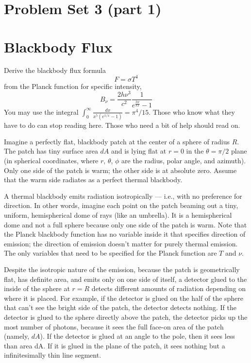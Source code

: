 \documentclass[11pt]{article}
\begin{document}
\pagestyle{empty}
\parindent=0pt

\section*{\centering Problem Set 3 (part 1)}

\section{Blackbody Flux}

Derive the blackbody flux formula
\begin{equation}
F=\sigma T^4
\end{equation}
from the Planck function for specific intensity,
\begin{equation}
B_\nu=\frac{2h\nu^3}{c^2}\frac{1}{e^\frac{h\nu}{kT} - 1}
\end{equation}
You may use the integral $\int_0^\infty{\frac{dx}{x^5(e^{1/x}-1)}}=\pi^4/15$.
Those who know what they have to do can stop reading here. Those who need a bit of help should read on.

Imagine a perfectly flat, blackbody patch at the center of a sphere of radius
$R$. The patch has tiny surface area $dA$ and is lying flat at $r = 0$ in the $\theta=\pi/2$
plane (in spherical coordinates, where $r$, $\theta$, $\phi$ are the radius, polar angle, and
azimuth). Only one side of the patch is warm; the other side is at absolute
zero. Assume that the warm side radiates as a perfect thermal blackbody.

A thermal blackbody emits radiation isotropically --- i.e., with no preference for
direction. In other words, imagine each point on the patch beaming out a tiny,
uniform, hemispherical dome of rays (like an umbrella). It is a hemispherical
dome and not a full sphere because only one side of the patch is warm. Note
that the Planck blackbody function has no variable inside it that specifies
direction of emission; the direction of emission doesn't matter for purely
thermal emission. The only variables that need to be specified for the Planck
function are $T$ and $\nu$.

Despite the isotropic nature of the emission, because the patch is
geometrically flat, has definite area, and emits only on one side of itself, a
detector glued to the inside of the sphere at $r = R$ detects different amounts
of radiation depending on where it is placed. For example, if the detector is
glued on the half of the sphere that can’t see the bright side of the patch,
the detector detects nothing. If the detector is glued to the sphere directly
above the patch, the detector picks up the most number of photons, because it
sees the full face-on area of the patch (namely, $dA$). If the detector is glued
at an angle to the pole, then it sees less than area dA. If it is glued in the
plane of the patch, it sees nothing but a infinitesimally thin line segment.
\end{document}
